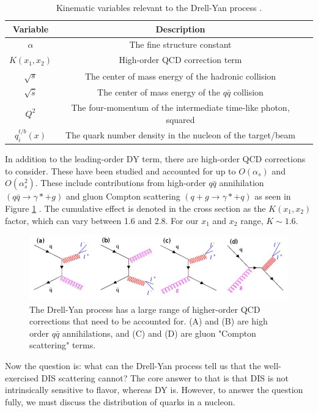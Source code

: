 \documentclass[11pt]{article}
\begin{document}
 \begin{table}[h]
  \begin{tabular}{ccl}
  Variable&Description\\ \hline \hline
  $\alpha$ & The fine structure constant \\
  $K(x_1,x_2)$ & High-order QCD correction term \\ \hline
  $\sqrt{s}$ & The center of mass energy of the hadronic collision \\
  $\sqrt{\hat{s}}$ & The center of mass energy of the $q\bar{q}$ collision \\
  $Q^{2}$ & The four-momentum of the intermediate time-like photon, squared \\ 
  $q_i^{t/b}(x)$ & The quark number density in the nucleon of the target/beam \\ \hline \hline
  \end{tabular}
  \caption{Kinematic variables relevant to the Drell-Yan process .}
  \label{tab:var}
  \end{table}


In addition to the leading-order DY term, there are high-order QCD corrections to consider. These have been studied and accounted for up to $O(\alpha_s)$ and $O(\alpha_s^2)$. These include contributions from high-order $q\bar{q}$ annihilation $(q \bar{q} \rightarrow \gamma * + g)$ and gluon Compton scattering $(q + g \rightarrow \gamma * + q)$ as seen in Figure \ref{fig:nlo-dy} \cite{duan-2007-50}. The cumulative effect is denoted in the cross section as the $K(x_1,x_2)$ factor, which can vary between 1.6 and 2.8.  For our $x_1$ and $x_2$ range, $K \sim 1.6$.

\begin{figure}[h]
    \centerline{
    \mbox{\includegraphics[width=5.00in]{DY.jpeg}}
    }
    \caption{The Drell-Yan process has a large range of higher-order QCD corrections that need to be accounted for. (A) and (B) are high order $q\bar{q}$ annihilations, and (C) and (D) are gluon "Compton scattering" terms.}
    \label{fig:nlo-dy}
\end{figure}

Now the question is: what can the Drell-Yan process tell us that the well-exercised DIS scattering cannot? The core answer to that is that DIS is not intrinsically sensitive to flavor, whereas DY is. However, to answer the question fully, we must discuss the distribution of quarks in a nucleon.  
\end{document}
